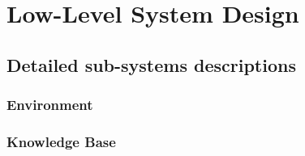 






\chapter{Low-Level System Design} 
\label{Detailed_design}



\section{Detailed sub-systems descriptions}



\subsection{Environment}
\subsection{Knowledge Base}
